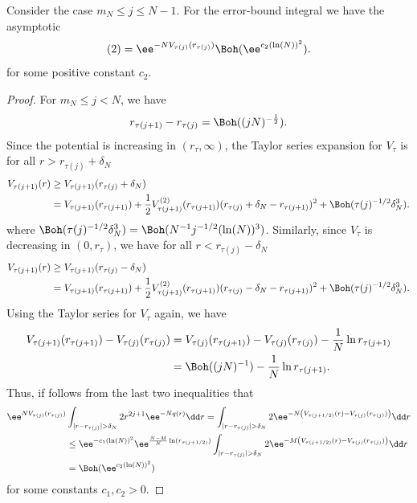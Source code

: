 \begin{lema}
	Consider the case $m_N \leq j \leq N-1$. For the error-bound integral we have the asymptotic
	\begin{equation}
	(2) =  \ee^{-N V_{\tau(j)}(r_{\tau(j)})} \Boh(\ee^{c_2 (\ln(N))^2}).
	\end{equation}
	for some positive constant $c_2$.
\end{lema}
\begin{proof}

For $m_N \leq j < N$, we have
\begin{equation}
	r_{\tau(j + 1)} - r_{\tau(j)} = \Boh((jN)^{-\frac{1}{2}}).
\end{equation}
Since the potential is increasing in $(r_\tau, \infty)$, the Taylor series expansion for $V_\tau$ is for all $r > r_{\tau(j)} + \delta_N$
\begin{align}
	V_{\tau(j + 1)}(r) & \geq V_{\tau(j + 1)}(r_{\tau(j)} + \delta_N) \\
	& = V_{\tau(j + 1)}(r_{\tau(j + 1)}) + \frac{1}{2} V^{(2)}_{\tau(j + 1)}(r_{\tau(j + 1)}) (r_{\tau(j)} + \delta_N - r_{\tau(j + 1)})^2 + \Boh(\tau(j)^{-1/2} \delta^3_N).
\end{align}
where $\Boh(\tau(j)^{-1/2} \delta^3_N) = \Boh(N^{-1} j^{-1/2}(\ln(N))^3)$. Similarly, since $V_{\tau}$ is decreasing in $(0, r_\tau)$, we have for all $r < r_{\tau(j)} - \delta_N$
\begin{align}
	V_{\tau(j + 1)}(r) & \geq V_{\tau(j +1)}(r_{\tau(j)} - \delta_N) \\
	& = V_{\tau(j + 1)}(r_{\tau(j + 1)}) + \frac{1}{2} V^{(2)}_{\tau(j + 1)}(r_{\tau(j + 1)}) (r_{\tau(j)} - \delta_N - r_{\tau(j + 1)})^2 + \Boh(\tau(j)^{-1/2} \delta^3_N).
\end{align}
Using the Taylor series for $V_\tau$ again, we have
\begin{align}
	V_{\tau(j+1)}(r_{\tau(j+1)}) - V_{\tau(j)}(r_{\tau(j)}) & = V_{\tau(j)}(r_{\tau(j+1)}) - V_{\tau(j)}(r_{\tau(j)}) - \frac{1}{N} \ln r_{\tau(j+1)} \\
	& = \Boh((jN)^{-1})  - \frac{1}{N} \ln r_{\tau(j+1)}.
\end{align}
Thus, if follows from the last two inequalities that
\begin{align}
	\ee^{N V_{\tau(j)}(r_{\tau(j)})} & \int_{|r - r_{\tau(j)}| > \delta_N} 2 r^{2j+1} \ee^{-N q(r)} \dd r = \int_{|r - r_{\tau(j)}| > \delta_N} 2 \ee^{-N \left( V_{\tau(j + 1/2)}(r) - V_{\tau(j)}(r_{\tau(j)}) \right)} \dd r \\
	& \leq \ee^{-c_1 (\ln(N))^2} \ee^{\frac{N-M}{N} \ln(r_{\tau(j+1/2)})}  \int_{|r - r_{\tau(j)}| > \delta_N} 2 \ee^{-M \left( V_{\tau(j + 1/2)}(r) - V_{\tau(j)}(r_{\tau(j)}) \right)} \dd r \\
	& = \Boh(\ee^{c_2 (\ln(N))^2})
\end{align}
for some constants $c_1, c_2 > 0$. 
\end{proof}


